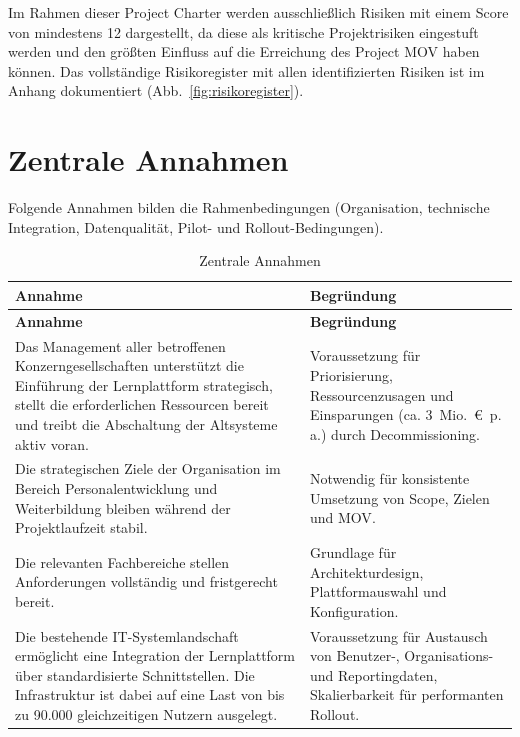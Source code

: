 Im Rahmen dieser Project Charter werden ausschließlich Risiken mit
einem Score von mindestens 12 dargestellt, da diese als kritische
Projektrisiken eingestuft werden und den größten Einfluss auf die
Erreichung des Project \ac{MOV} haben können. Das vollständige
Risikoregister mit allen identifizierten Risiken ist im Anhang
dokumentiert (Abb.~\ref{fig:risikoregister}).

\section{Zentrale Annahmen}

Folgende Annahmen bilden die Rahmenbedingungen (Organisation, technische
Integration, Datenqualität, Pilot- und Rollout-Bedingungen).

\begin{xltabular}{\textwidth}{@{}>{\hsize}X>{\hsize}X@{}}
    \caption{Zentrale Annahmen} \label{tab:annahmen} \\
    \toprule
    \textbf{Annahme} & \textbf{Begründung} \\
    \midrule
    \endfirsthead

    \toprule
    \textbf{Annahme} & \textbf{Begründung} \\
    \midrule
    \endhead

    \bottomrule
    \endfoot

    Das Management aller betroffenen Konzerngesellschaften unterstützt
    die Einführung der Lernplattform strategisch, stellt die
    erforderlichen Ressourcen bereit und treibt die Abschaltung der
    Altsysteme aktiv voran. &
    Voraussetzung für Priorisierung, Ressourcenzusagen und Einsparungen (ca. 3~Mio.~€~p.\,a.) durch Decommissioning. \\

    Die strategischen Ziele der Organisation im Bereich
    Personalentwicklung und Weiterbildung bleiben während der
    Projektlaufzeit stabil. &
    Notwendig für konsistente Umsetzung von Scope, Zielen und \acs{MOV}. \\

    Die relevanten Fachbereiche stellen Anforderungen vollständig
    und fristgerecht bereit. &
    Grundlage für Architekturdesign, Plattformauswahl und Konfiguration. \\

    Die bestehende \ac{IT}-Systemlandschaft ermöglicht eine Integration
    der Lernplattform über standardisierte Schnittstellen. Die
    Infrastruktur ist dabei auf eine Last von bis zu
    90.000 gleichzeitigen Nutzern ausgelegt. &
    Voraussetzung für Austausch von Benutzer-, Organisations- und Reportingdaten, Skalierbarkeit für performanten Rollout. \\


\end{xltabular}
